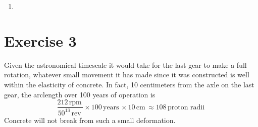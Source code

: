 \documentclass[12pt]{article}
\newcommand{\Unit}[1]{\,\text{#1} \,}
\begin{document}
\begin{enumerate}
\item{
}
\end{enumerate}

\section*{Exercise 3}

Given the astronomical timescale it would take for the last gear to make a full rotation, whatever small movement it has made since it was constructed is well within the elasticity of concrete. In fact, 10 centimeters from the axle on the last gear, the arclength over 100 years of operation is
$$
\frac{212 \Unit{rpm}}{50^{13} \Unit{rev}} \times 100 \Unit{years} \times 10 \Unit{cm} \approx 108 \Unit{proton radii} 
$$
Concrete will not break from such a small deformation.
\end{document}
